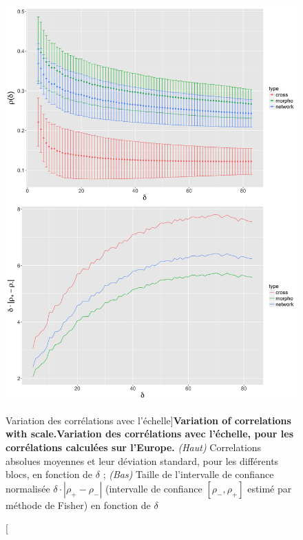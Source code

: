 \begin{figure}
\includegraphics[width=\linewidth,height=0.85\textheight]{Figures/Final/4-1-3-fig-staticcorrs-corrsdistrib}
\caption[Variation of correlations with scale][Variation des corrélations avec l'échelle]{\textbf{Variation of correlations with scale.}\label{fig:staticcorrs:corrsdistrib}}{\textbf{Variation des corrélations avec l'échelle, pour les corrélations calculées sur l'Europe.} \textit{(Haut)} Correlations absolues moyennes et leur déviation standard, pour les différents blocs, en fonction de $\delta$ ; \textit{(Bas)} Taille de l'intervalle de confiance normalisée $\delta\cdot \left|\rho_{+} - \rho_{-}\right|$ (intervalle de confiance $\left[\rho_{-} , \rho_{+}\right]$ estimé par méthode de Fisher) en fonction de $\delta$ \label{fig:staticcorrs:corrsdistrib}}
\end{figure}



